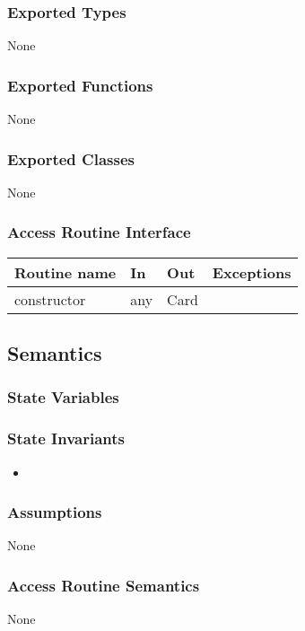 \documentclass[12pt]{article}
\begin{document}
\subsubsection{Exported Types}
None
 
\subsubsection{Exported Functions}
None

\subsubsection{Exported Classes}
None

\subsubsection{Access Routine Interface}
\begin{tabular}{| l | l | l | p{5cm} |}
  \hline
  \textbf{Routine name} & \textbf{In} & \textbf{Out} & \textbf{Exceptions}\\
  \hline
  constructor & any & Card & ~\\
  \hline
  \end{tabular}

\bigskip
\subsection{Semantics}
\subsubsection{State Variables}


\subsubsection{State Invariants}
\begin{itemize}
  \item 
\end{itemize}

\subsubsection{Assumptions}
None

\subsubsection{Access Routine Semantics}
None
\end{document}
